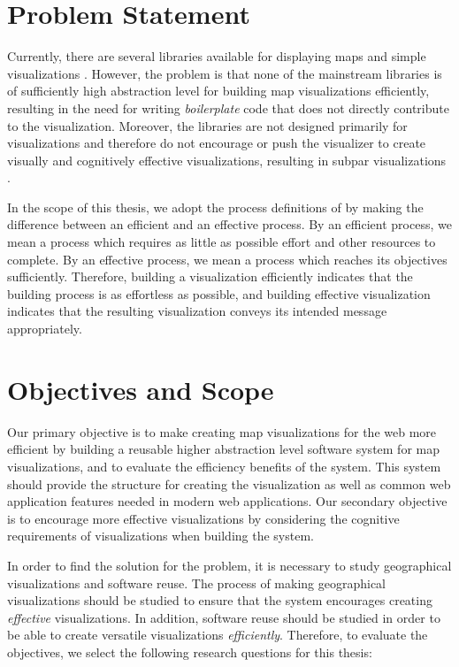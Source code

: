 \section{Problem Statement}

Currently, there are several libraries available for displaying maps and simple visualizations \citep{google_maps_2005,agafonkin_leaflet_2011,metacarta_openlayers_2006}. However, the problem is that none of the mainstream libraries is of sufficiently high abstraction level for building map visualizations efficiently, resulting in the need for writing \emph{boilerplate} code that does not directly contribute to the visualization. Moreover, the libraries are not designed primarily for visualizations and therefore do not encourage or push the visualizer to create visually and cognitively effective visualizations, resulting in subpar visualizations \citep[chap.~1]{slocum_thematic_2014}.

In the scope of this thesis, we adopt the process definitions of \citet{van_wijk_value_2005} by making the difference between an efficient and an effective process. By an efficient process, we mean a process which requires as little as possible effort and other resources to complete. By an effective process, we mean a process which reaches its objectives sufficiently. Therefore, building a visualization efficiently indicates that the building process is as effortless as possible, and building effective visualization indicates that the resulting visualization conveys its intended message appropriately.

\section{Objectives and Scope}

Our primary objective is to make creating map visualizations for the web more efficient by building a reusable higher abstraction level software system for map visualizations, and to evaluate the efficiency benefits of the system. This system should provide the structure for creating the visualization as well as common web application features needed in modern web applications. Our secondary objective is to encourage more effective visualizations by considering the cognitive requirements of visualizations when building the system.

In order to find the solution for the problem, it is necessary to study geographical visualizations and software reuse. The process of making geographical visualizations should be studied to ensure that the system encourages creating \emph{effective} visualizations. In addition, software reuse should be studied in order to be able to create versatile visualizations \emph{efficiently}. Therefore, to evaluate the objectives, we select the following research questions for this thesis:

